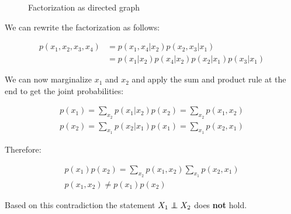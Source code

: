 \documentclass[a4paper]{article}
\newcommand\independent{\protect\mathpalette{\protect\independenT}{\perp}}
\def\independenT#1#2{\mathrel{\rlap{$#1#2$}\mkern2mu{#1#2}}}
\begin{document}
\begin{figure}[h]
\centering
\caption{Factorization as directed graph} \label{fig:directed_graph}
\end{figure}

We can rewrite the factorization as follows:

\begin{align*}
	p(x_1,x_2,x_3,x_4) &= p(x_1,x_4|x_2)p(x_2,x_3|x_1)\\
	&= p(x_1|x_2)p(x_4|x_2)p(x_2|x_1)p(x_3|x_1)
\end{align*}

We can now marginalize $x_1$ and $x_2$ and apply the sum and product rule at the end to get the joint probabilities:

\begin{align*}
	p(x_1) = \sum_{x_2} p(x_1|x_2)p(x_2) = \sum_{x_2} p(x_1,x_2)\\
	p(x_2) = \sum_{x_1} p(x_2|x_1)p(x_1) = \sum_{x_1} p(x_2, x_1)
\end{align*}

Therefore:

\begin{align*}
	p(x_1)p(x_2) = \sum_{x_2} p(x_1,x_2) \sum_{x_1} p(x_2, x_1)\\
	p(x_1, x_2) \neq p(x_1)p(x_2)
\end{align*}

Based on this contradiction the statement $X_1 \independent X_2$ does \textbf{not} hold.
\end{document}
